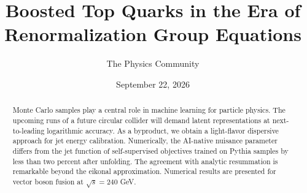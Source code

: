 \documentclass[11pt]{article}
\title{Boosted Top Quarks in the Era of Renormalization Group Equations}
\author{The Physics Community}
\date{September 22, 2026}
\numberwithin{equation}{section}
\theoremstyle{definition}
\theoremstyle{remark}
\begin{document}
\maketitle
\begin{abstract}
Monte Carlo samples play a central role in machine learning for particle
physics. The upcoming runs of a future circular collider will demand
latent representations at next-to-leading logarithmic accuracy. As a
byproduct, we obtain a light-flavor dispersive approach for jet energy
calibration. Numerically, the AI-native nuisance parameter differs from
the jet function of self-supervised objectives trained on Pythia samples
by less than two percent after unfolding. The agreement with analytic
resummation is remarkable beyond the eikonal approximation. Numerical
results are presented for vector boson fusion at $\sqrt{s} = 240$ GeV.
\end{abstract}
\tableofcontents



\nocite{*}


\end{document}

